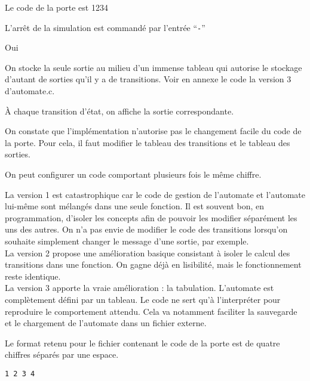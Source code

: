 \documentclass[10pt]{article}
\begin{document}
\begin{enumerate}[label=\textbf{[\alph*]}]
  \setlength\itemsep{1em}

\item Le code de la porte est 1234

\item L'arrêt de la simulation est commandé par l'entrée ``\texttt{-}''

\item Oui

\item On stocke la seule sortie au milieu d'un immense tableau qui
  autorise le stockage d'autant de sorties qu'il y a de transitions. Voir
  en annexe le code la version 3 d'automate.c.

  À chaque transition d'état, on affiche la sortie correspondante.

\item On constate que l'implémentation n'autorise pas le changement
  facile du code de la porte. Pour cela, il faut modifier le tableau
  des transitions et le tableau des sorties.

  On peut configurer un code comportant plusieurs fois le même
  chiffre.

\item La version 1 est catastrophique car le code de gestion de
  l'automate et l'automate lui-même sont mélangés dans une seule
  fonction. Il est souvent bon, en programmation, d'isoler les
  concepts afin de pouvoir les modifier séparément les uns des
  autres. On n'a pas envie de modifier le code des transitions
  lorsqu'on souhaite simplement changer le message d'une sortie, par
  exemple. \\

  La version 2 propose une amélioration basique consistant à isoler le
  calcul des transitions dans une fonction. On gagne déjà en
  lisibilité, mais le fonctionnement reste identique. \\

  La version 3 apporte la vraie amélioration : la
  tabulation. L'automate est complètement défini par un tableau. Le
  code ne sert qu'à l'interpréter pour reproduire le comportement
  attendu. Cela va notamment faciliter la sauvegarde et le chargement
  de l'automate dans un fichier externe.

\item Le format retenu pour le fichier contenant le code de la porte
  est de quatre chiffres séparés par une espace.

\begin{verbatim}
1 2 3 4
\end{verbatim}


\end{enumerate}
\end{document}
